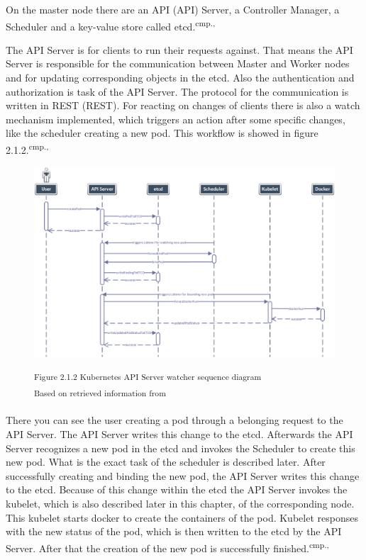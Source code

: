 On the master node there are an \acs{API} (\acl{API}) Server, a Controller Manager, a Scheduler and a key-value store called etcd.\textsuperscript{cmp.\cite{13}, \cite{16}}

The API Server is for clients to run their requests against. That means the API Server is responsible for the communication between Master and Worker nodes and for updating corresponding objects in the etcd. Also the authentication and authorization is task of the API Server. The protocol for the communication is written in \acs{REST} (\acl{REST}). For reacting on changes of clients there is also a watch mechanism implemented, which triggers an action after some specific changes, like the scheduler creating a new pod. This workflow is showed in figure 2.1.2.\textsuperscript{cmp.\cite{13}, \cite{16}}

\begin{figure}[h]
\centering
\includegraphics[width=\textwidth]{images/kubernetes_watcher_sequence.png}

\textsuperscript{Figure 2.1.2 Kubernetes API Server watcher sequence diagram}\\
\textsuperscript{Based on retrieved information from \cite{16}}
\end{figure}

There you can see the user creating a pod through a belonging request to the API Server. The API Server writes this change to the etcd. Afterwards the API Server recognizes a new pod in the etcd and invokes the Scheduler to create this new pod. What is the exact task of the scheduler is described later. After successfully creating and binding the new pod, the API Server writes this change to the etcd. Because of this change within the etcd the API Server invokes the kubelet, which is also described later in this chapter, of the corresponding node. This kubelet starts docker to create the containers of the pod. Kubelet responses with the new status of the pod, which is then written to the etcd by the API Server. After that the creation of the new pod is successfully finished.\textsuperscript{cmp.\cite{13}, \cite{16}}

